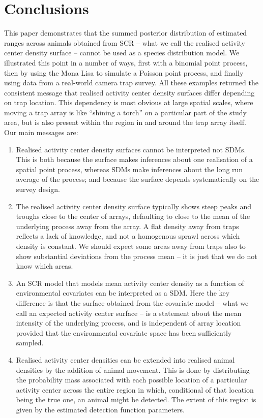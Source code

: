 \documentclass[a4paper,12pt]{article}
\begin{document}
\section{Conclusions}
This paper demonstrates that the summed posterior distribution of estimated ranges across animals obtained from SCR -- what we call the realised activity center density surface -- cannot be used as a species distribution model. We illustrated this point in a number of ways, first with a binomial point process, then by using the Mona Lisa to simulate a Poisson point process, and finally using data from a real-world camera trap survey. All these examples returned the consistent message that realised activity center density surfaces differ depending on trap location. This dependency is most obvious at large spatial scales, where moving a trap array is like ``shining a torch'' on a particular part of the study area, but is also present within the region in and around the trap array itself. Our main messages are:
\begin{enumerate}
\item Realised activity center density surfaces cannot be interpreted not SDMs. This is both because the surface makes inferences about one realisation of a spatial point process, whereas SDMs make inferences about the long run average of the process; and because the surface depends systematically on the survey design.
\item The realised activity center density surface typically shows steep peaks and troughs close to the center of arrays, defaulting to close to the mean of the underlying process away from the array. A flat density away from traps reflects a lack of knowledge, and not a homogenous sprawl across which density is constant. We should expect some areas away from traps also to show substantial deviations from the process mean -- it is just that we do not know which areas.
\item An SCR model that models mean activity center density as a function of environmental covariates can be interpreted as a SDM. Here the key difference is that the surface obtained from the covariate model -- what we call an expected activity center surface -- is a statement about the mean intensity of the underlying process, and is independent of array location provided that the environmental covariate space has been sufficiently sampled.
\item Realised activity center densities can be extended into realised animal densities by the addition of animal movement. This is done by distributing the probability mass associated with each possible location of a particular activity center across the entire region in which, conditional of that location being the true one, an animal might be detected. The extent of this region is given by the estimated detection function parameters. 
\end{enumerate}




\end{document}
